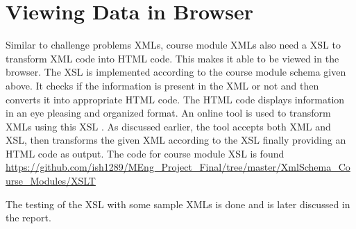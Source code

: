 \documentclass[11pt,letterpaper]{report}
\begin{document}
 

\section{Viewing Data in Browser}
Similar to challenge problems XMLs, course module XMLs also need a XSL to transform XML code into HTML code. This makes it able to be viewed in the browser. The XSL is implemented according to the course module schema given above. It checks if the information is present in the XML or not and then converts it into appropriate HTML code. The HTML code displays information in an eye pleasing and organized format. An online tool is used to transform XMLs using this XSL \cite{olXSL}. As discussed earlier, the tool accepts both XML and XSL, then transforms the given XML according to the XSL finally providing an HTML code as output. The code for course module XSL is found \url{https://github.com/ish1289/MEng_Project_Final/tree/master/XmlSchema_Course_Modules/XSLT}

\bigskip

The testing of the XSL with some sample XMLs is done and is later discussed in the report. 
\end{document}
